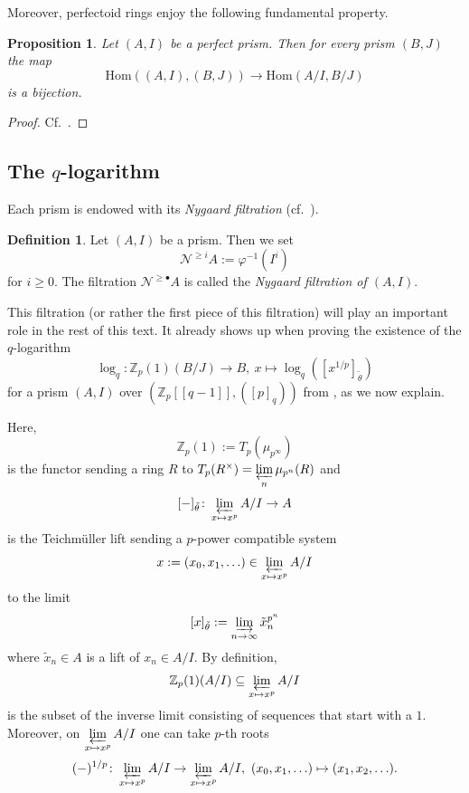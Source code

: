 \documentclass{amsart}
\theoremstyle{plain}
\newtheorem{proposition}[theorem]{Proposition}
\theoremstyle{definition}
\newtheorem{definition}[theorem]{Definition}
\newcommand{\Z}{\mathbb{Z}}
\newcommand{\red}[1]{{\color{black} #1}}
\begin{document}
Moreover, perfectoid rings enjoy the following fundamental property.

\begin{proposition}
  \label{sec:prisms-perf-rings-lemma-initial-object-for-perfectoid-rings}
  Let $(A,I)$ be a perfect prism. Then for every prism $(B,J)$ the map
  $$
  \mathrm{Hom}((A,I),(B,J))\to \mathrm{Hom}(A/I,B/J)
  $$
  is a bijection.
\end{proposition}
\begin{proof}
  Cf.\ \cite[Lemma 4.7]{bhatt_scholze_prisms_and_prismatic_cohomology}.
\end{proof}

\subsection{The $q$-logarithm}
\label{sec:q-logarithm}
Each prism is endowed with its \textit{Nygaard filtration} (cf.\ \cite[Definition 11.2]{bhatt_lectures_on_prismatic_cohomology}).
\begin{definition}
  \label{sec:generalities-prisms-definition-nygaard-filtration}
  Let $(A,I)$ be a prism. Then we set
  $$
  \mathcal{N}^{\geq i}A:=\varphi^{-1}(I^i)
  $$
  for $i\geq 0$. The filtration $\mathcal{N}^{\geq \bullet}A$ is called the \textit{Nygaard filtration of $(A,I)$}.
\end{definition}


This filtration (or rather the first piece of this filtration) will play an important role in the rest of this text. It already shows up when proving the existence of the $q$-logarithm
$$
\log_q\colon \Z_p(1)(B/J)\to B,\ x\mapsto \log_q([x^{1/p}]_{\tilde{\theta}})
$$
for a prism $(A,I)$ over $(\Z_p[[q-1]],([p]_q))$ from , as we now explain. 

Here,
$$
\Z_p(1):=T_p(\mu_{p^\infty})
$$
is the functor sending a ring $R$ to $T_p(R^\times)=\varprojlim\limits_n\mu_{p^n}(R)$
and
$$
[-]_{\tilde{\theta}}\colon \varprojlim\limits_{x\mapsto x^p} A/I \to A
$$
is the Teichm\"uller lift sending a $p$-power compatible system
$$
x:=(x_0,x_1,\ldots)\in \varprojlim\limits_{x\mapsto x^p} A/I
$$
to the limit
$$
[x]_{\tilde{\theta}}:=\varinjlim\limits_{n\to \infty} \tilde{x}_n^{p^n}
$$
where $\tilde{x}_n\in A$ is a lift of $x_n\in A/I$. \red{By definition, 
$$
\Z_p(1)(A/I)\subseteq \varprojlim\limits_{x\mapsto x^p} A/I
$$
is the subset of the inverse limit consisting of sequences that start with a $1$.}
Moreover, on $\varprojlim\limits_{x\mapsto x^p} A/I$ one can take $p$-th roots
$$
(-)^{1/p}\colon \varprojlim\limits_{x\mapsto x^p} A/I\to \varprojlim\limits_{x\mapsto x^p} A/I,\ (x_0,x_1,\ldots)\mapsto (x_1,x_2,\ldots).
$$
\end{document}
